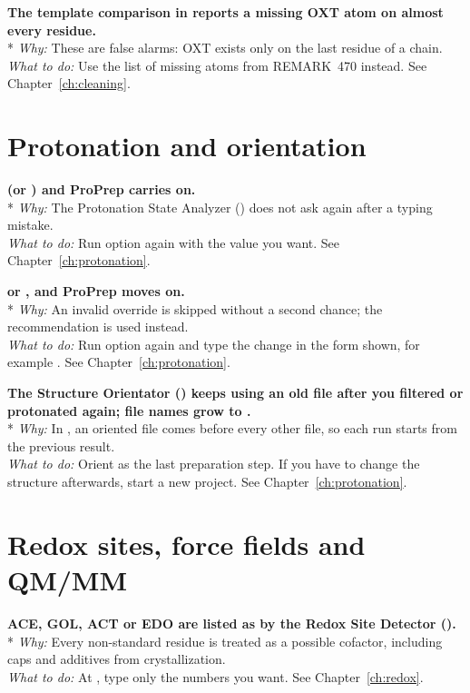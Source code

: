 {\bfseries The template comparison in  reports a missing OXT atom on
almost every residue.}\\*
\emph{Why:} These are false alarms: OXT exists only on the last residue of a
chain.\\
\emph{What to do:} Use the list of missing atoms from REMARK~470 instead. See
Chapter~\ref{ch:cleaning}.

\section{Protonation and orientation}\label{sec:troubleshooting-protonation}

{\bfseries {} (or ) and ProPrep carries on.}\\*
\emph{Why:} The Protonation State Analyzer () does not ask again
after a typing mistake.\\
\emph{What to do:} Run option  again with the value you want. See
Chapter~\ref{ch:protonation}.

{\bfseries {} or
, and ProPrep moves
on.}\\*
\emph{Why:} An invalid override is skipped without a second chance; the
recommendation is used instead.\\
\emph{What to do:} Run option  again and type the change in the form
shown, for example . See Chapter~\ref{ch:protonation}.

{\bfseries The Structure Orientator () keeps using an old file after
you filtered or protonated again; file names grow to
.}\\*
\emph{Why:} In , an oriented file comes before every other file, so
each run starts from the previous result.\\
\emph{What to do:} Orient as the last preparation step. If you have to change
the structure afterwards, start a new project. See
Chapter~\ref{ch:protonation}.

\section{Redox sites, force fields and QM/MM}\label{sec:troubleshooting-redox}

{\bfseries ACE, GOL, ACT or EDO are listed as  by the
Redox Site Detector ().}\\*
\emph{Why:} Every non-standard residue is treated as a possible cofactor,
including caps and additives from crystallization.\\
\emph{What to do:} At , type
only the numbers you want. See Chapter~\ref{ch:redox}.

